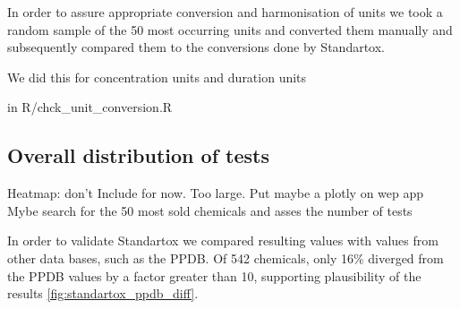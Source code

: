In order to assure appropriate conversion and harmonisation of units we took a random sample of the 50 most occurring units and converted them manually and subsequently compared them to the conversions done by Standartox.

We did this for concentration units and duration units

in R/chck\_unit\_conversion.R


\subsection{Overall distribution of tests}
Heatmap: don't Include for now. Too large.
Put maybe a plotly on wep app
Mybe search for the 50 most sold chemicals and asses the number of tests


In order to validate Standartox we compared resulting values with values from other data bases, such as the PPDB. Of 542 chemicals, only 16\% diverged from the PPDB values by a factor greater than 10, supporting plausibility of the \standartox results \ref{fig:standartox_ppdb_diff}.


